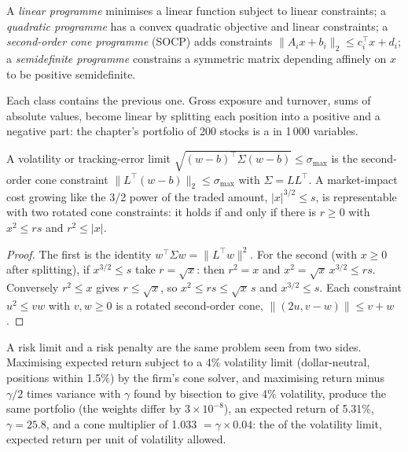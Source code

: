\begin{definition}\label{def:qm:convex-optimisation:classes}
A \emph{linear programme} minimises a linear function subject to linear constraints; a \emph{quadratic programme} has a convex quadratic
objective and linear constraints; a \emph{second-order cone programme} (SOCP) adds constraints $\lVert A_ix + b_i\rVert_2 \le c_i^\top x + d_i$; a
\emph{semidefinite programme} constrains a symmetric matrix depending affinely on $x$ to be positive semidefinite.
\end{definition}

Each class contains the previous one. Gross exposure and turnover, sums of absolute values, become linear by splitting each position into a positive and a negative part: the chapter's
portfolio of 200 stocks is a  in 1\,000 variables.

\begin{proposition}\label{prop:qm:convex-optimisation:cones}
A volatility or tracking-error limit $\sqrt{(w - b)^\top\Sigma(w - b)} \le \sigma_{\max}$ is the second-order cone constraint $\lVert L^\top(w - b)\rVert_2 \le \sigma_{\max}$ with $\Sigma =
LL^\top$. A market-impact cost growing like the 3/2 power of the traded amount, $|x|^{3/2} \le s$, is representable with two rotated cone constraints: it holds if and only if there is
$r \ge 0$ with $x^2 \le rs$ and $r^2 \le |x|$.
\end{proposition}

\begin{proof}
The first is the identity $w^\top\Sigma w = \lVert L^\top w\rVert^2$. For the second (with $x \ge 0$ after splitting), if $x^{3/2} \le s$ take $r = \sqrt x$: then $r^2 = x$ and $x^2 = \sqrt x\,x^{3/2} \le rs$.
Conversely $r^2 \le x$ gives $r \le \sqrt x$, so $x^2 \le rs \le \sqrt x\,s$ and $x^{3/2} \le s$. Each constraint $u^2 \le vw$ with $v, w \ge 0$ is a rotated second-order cone,
$\lVert(2u, v - w)\rVert \le v + w$.
\end{proof}

A risk limit and a risk penalty are the same problem seen from two sides. Maximising expected return subject to a 4\% volatility limit (dollar-neutral, positions within 1.5\%) by the
firm's cone solver, and maximising return minus $\gamma/2$ times variance with $\gamma$ found by bisection to give 4\% volatility, produce the same portfolio (the weights differ by
$3 \times 10^{-8}$), an expected return of 5.31\%, $\gamma = 25.8$, and a cone multiplier of 1.033 $= \gamma \times 0.04$: the  of the volatility limit, expected return per unit of
volatility allowed.

